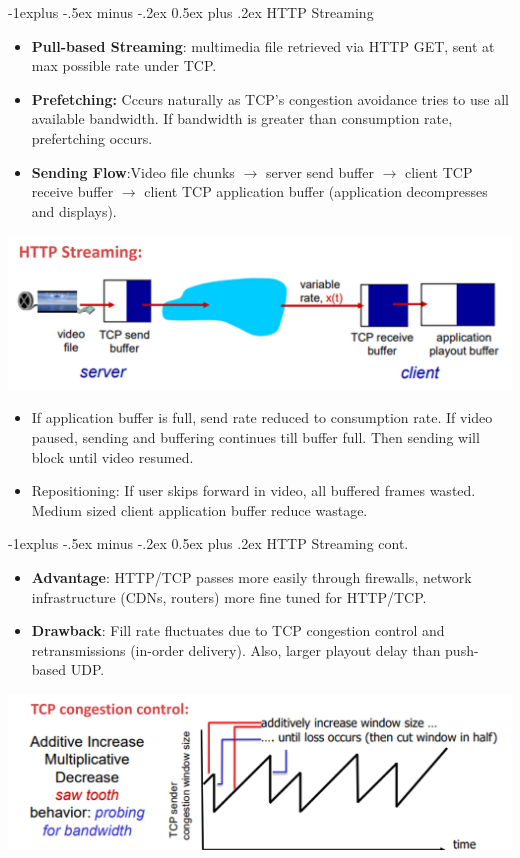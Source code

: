 \documentclass[12pt, landscape]{article}
\makeatletter
\renewcommand{\subsection}{\@startsection{subsection}{2}{0.1mm}%
                                {-1explus -.5ex minus -.2ex}%
                                {0.5ex plus .2ex}%
                                {\normalfont\normalsize\bfseries}}
\makeatother
\begin{document}
\begin{multicols*}{3}
\subsection{HTTP Streaming}
\begin{itemize}
\item \textbf	{Pull-based Streaming}: multimedia file retrieved via HTTP GET, sent at max possible rate under TCP.
\item \textbf{Prefetching:} Cccurs naturally as TCP’s congestion avoidance tries to use all available bandwidth. If bandwidth is greater than consumption rate, prefertching occurs.
\item \textbf{Sending Flow}:Video file chunks $\rightarrow$ server send buffer  $\rightarrow$ client TCP receive buffer  $\rightarrow$ client TCP application buffer (application decompresses and displays).
\end{itemize}
\centerline{\includegraphics[width=0.8\linewidth]{httpstream}}
\begin{itemize}
\item If application buffer is full, send rate reduced to consumption rate. If video paused, sending and buffering continues till buffer full. Then sending will block until video resumed. 
\item Repositioning: If user skips forward in video, all buffered frames wasted. Medium sized client application buffer reduce wastage.
\end{itemize}

\columnbreak

\subsection{HTTP Streaming cont.}
\begin{itemize}
\item \textbf{Advantage}: HTTP/TCP passes more easily through firewalls, network infrastructure (CDNs, routers) more fine tuned for HTTP/TCP.
\item \textbf{Drawback}: Fill rate fluctuates due to TCP congestion control and retransmissions (in-order delivery). Also, larger playout delay than push-based UDP.
\end{itemize}
\medskip
\centerline{\includegraphics[width=0.9\linewidth]{TCPcongestion}}


\end{multicols*}
\end{document}
